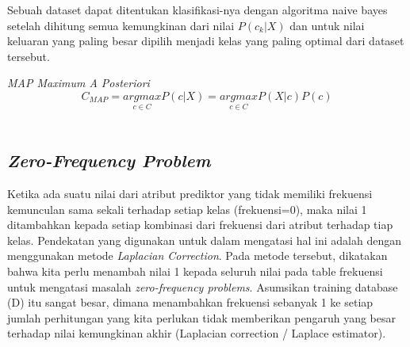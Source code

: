 Sebuah dataset dapat ditentukan klasifikasi-nya dengan algoritma naive bayes setelah dihitung semua kemungkinan dari nilai $P(c_k|X)$ dan untuk nilai keluaran yang paling besar dipilih menjadi kelas yang paling optimal dari dataset tersebut.

\textit{MAP Maximum A Posteriori}
		\begin{equation}
			C_{MAP} = \underset{c \in C}{ argmax } P(c|X) = \underset{c \in C}{ argmax } P(X|c) P(c)
		\end{equation} \\


\subsection{\textit{Zero-Frequency Problem}}
\label{subsec:Zero-Frequency Problem}
\cite{PeughMissing:2004} 
Ketika ada suatu nilai dari atribut prediktor yang tidak memiliki frekuensi kemunculan sama sekali terhadap setiap kelas (frekuensi=0), maka nilai 1 ditambahkan kepada setiap kombinasi dari frekuensi dari atribut terhadap tiap kelas. Pendekatan yang digunakan untuk dalam mengatasi hal ini adalah dengan menggunakan metode \textit{Laplacian Correction}. Pada metode tersebut, dikatakan bahwa kita perlu menambah nilai 1 kepada seluruh nilai pada table frekuensi untuk mengatasi masalah \textit{zero-frequency problems}. Asumsikan training database (D) itu sangat besar, dimana menambahkan frekuensi sebanyak 1 ke setiap jumlah perhitungan yang kita perlukan tidak memberikan pengaruh yang besar terhadap nilai kemungkinan akhir (Laplacian correction / Laplace estimator).

